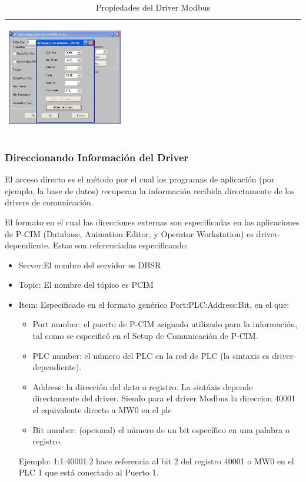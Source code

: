 \begin{table}[!ht]
\begin{tabular}{*{2}{m{}}}
\begin{center}
        \includegraphics[width=0.4\textwidth]
      {Cap5-SCADA/images/modbusDriver2.jpeg}
  \end{center}\\
\hline
\end{tabular}
\caption{Propiedades del Driver Modbus}
\label{tab:PropModbus}
\end{table}

\subsubsection{Direccionando Información del Driver}
\label{subsubsec:InforDriver}
El acceso directo es el método por el cual los programas de aplicación (por
ejemplo, la base de datos) recuperan la información recibida directamente de 
los drivers de comunicación.

El formato en el cual las direcciones externas son especificadas en las
aplicaciones de P-CIM (Database, Animation Editor, y Operator
Workstation) es driver-dependiente. Estas son referenciadas especificando:
\begin{itemize}
 \item Server:El nombre del servidor es DBSR
 \item Topic: El nombre del tópico es PCIM
 \item Item: Especificado en el formato genérico Port:PLC:Address:Bit, en
  el que:
  \begin{itemize}
   \item Port number: el puerto de P-CIM asignado utilizado para la 
    información, 
    tal como se especificó en el Setup de Comunicación de P-CIM.
   \item PLC number: el número del PLC en la red de PLC (la sintaxis es driver-
    dependiente).
    \item Address: la dirección del dato o registro. La sintáxis depende 
    directamente del driver. Siendo para el driver Modbus la direccion 40001 el 
    equivalente directo a MW0 en el \gls{plc}
    \item Bit number: (opcional) el número de un bit específico en una palabra 
    o registro.
  \end{itemize}
  Ejemplo: 1:1:40001:2 hace referencia al bit 2 del registro 40001 o MW0 en el 
  PLC 1 que está conectado al Puerto 1.
\end{itemize}

